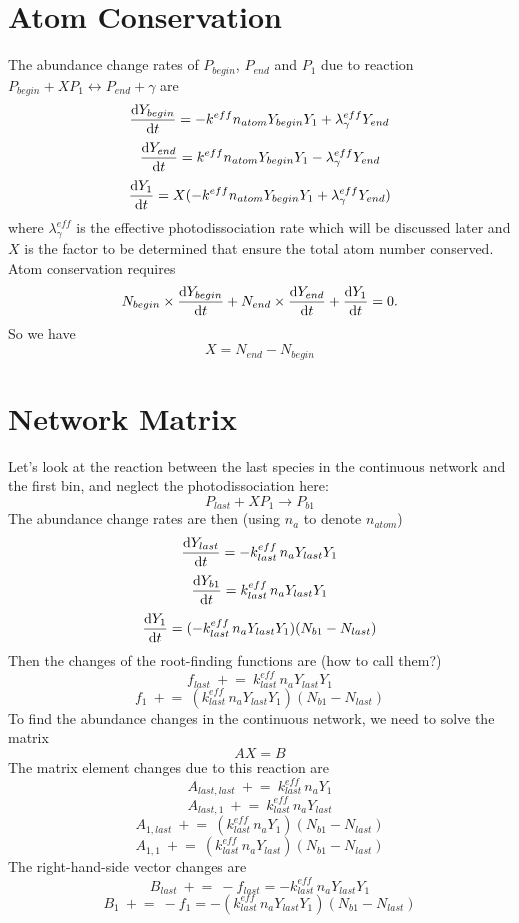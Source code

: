 \documentclass{article}
\begin{document}
\section{Atom Conservation}

The abundance change rates of $P_{begin}$, $P_{end}$ and $P_1$ due to 
reaction $P_{begin} + X P_1 \longleftrightarrow P_{end} + \gamma$ are
\[
\frac{{\rm d}Y_{begin}}{{\rm d}t} =
  -k^{eff} n_{atom} Y_{begin} Y_1 + \lambda_\gamma^{eff} Y_{end}  
\]
\[
\frac{{\rm d}Y_{end}}{{\rm d}t} =
  k^{eff} n_{atom} Y_{begin} Y_1 - \lambda_\gamma^{eff} Y_{end}  
\]
\[
\frac{{\rm d}Y_1}{{\rm d}t} =
  X( -k^{eff} n_{atom} Y_{begin} Y_1 + \lambda_\gamma^{eff} Y_{end} )
\]
where $\lambda_\gamma^{eff}$ is the effective photodissociation rate which
will be discussed later and $X$ is the factor to be determined that ensure
the total atom number conserved. Atom conservation requires
\[
N_{begin} \times \frac{{\rm d}Y_{begin}}{{\rm d}t} +
N_{end} \times \frac{{\rm d}Y_{end}}{{\rm d}t} +
\frac{{\rm d}Y_1}{{\rm d}t} = 0.
\] 
So we have
\[
X = N_{end} - N_{begin}
\]

\section{Network Matrix}
Let's look at the reaction between the last species in the continuous network
and the first bin, and neglect the photodissociation here:
\[
P_{last} + XP_1 \to P_{b1}
\]
The abundance change rates are then (using $n_a$ to denote $n_{atom}$)
\[
\frac{{\rm d}Y_{last}}{{\rm d}t} =
  -k^{eff}_{last} \, n_a Y_{last} Y_1
\]
\[
\frac{{\rm d}Y_{b1}}{{\rm d}t} =
  k^{eff}_{last} \, n_a Y_{last} Y_1
\]
\[
\frac{{\rm d}Y_1}{{\rm d}t} =
  ( -k^{eff}_{last} \, n_a Y_{last} Y_1 )(N_{b1} - N_{last})
\]
Then the changes of the root-finding functions are (how to call them?)
\[
f_{last} \: +\!\!= \: k^{eff}_{last} \, n_a Y_{last} Y_1
\]
\[
f_{1} \: +\!\!= \: (k^{eff}_{last} \, n_a Y_{last} Y_1) (N_{b1} - N_{last})
\]
To find the abundance changes in the continuous network, we need to solve the
matrix
\[
AX=B
\]
The matrix element changes due to this reaction are
\[
A_{last,last} \: +\!\!= \: k^{eff}_{last} \, n_a Y_1
\]
\[
A_{last,1} \: +\!\!= \: k^{eff}_{last} \, n_a Y_{last}
\]
\[
A_{1,last} \: +\!\!= \: (k^{eff}_{last} \, n_a Y_1)(N_{b1} - N_{last})
\]
\[
A_{1,1} \: +\!\!= \: (k^{eff}_{last} \, n_a Y_{last})(N_{b1} - N_{last})
\]
The right-hand-side vector changes are
\[
B_{last} \: +\!\!= \: -f_{last} = -k^{eff}_{last} \, n_a Y_{last} Y_1 
\]
\[
B_1 \:+\!\!=\: -f_1 = -(k^{eff}_{last}\,n_a Y_{last} Y_1)(N_{b1}-N_{last})
\]
\end{document}
